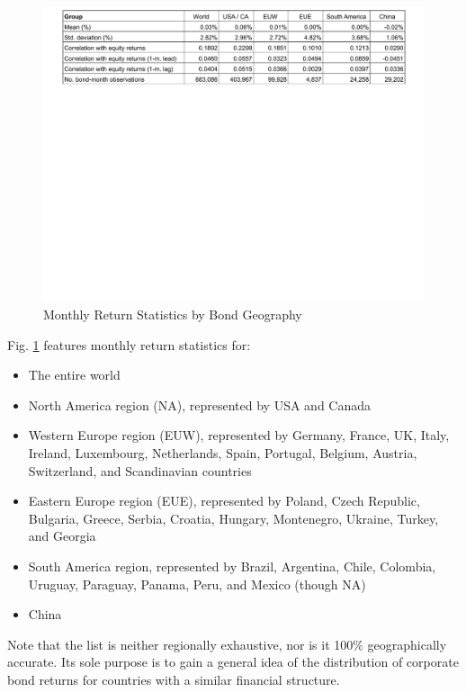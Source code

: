\begin{figure}[h]
	\centering
	\includegraphics[trim={0 15.5cm 0 0},clip,width=1.0\linewidth]{figures/summary-stats-by-geo.pdf}
	\caption{Monthly Return Statistics by Bond Geography}
	\label{fig:summary-stats-by-geo}
\end{figure}

Fig. \ref{fig:summary-stats-by-geo} features monthly return statistics for:
\begin{itemize}
	\item The entire world
	\item North America region (NA), represented by USA and Canada
	\item Western Europe region (EUW), represented by Germany, France, UK, Italy, Ireland, Luxembourg, Netherlands, Spain, Portugal, Belgium, Austria, Switzerland, and Scandinavian countries
	\item Eastern Europe region (EUE), represented by Poland, Czech Republic, Bulgaria, Greece, Serbia, Croatia, Hungary, Montenegro, Ukraine, Turkey, and Georgia
	\item South America region, represented by Brazil, Argentina, Chile, Colombia, Uruguay, Paraguay, Panama, Peru, and Mexico (though NA)
	\item China 
\end{itemize}
Note that the list is neither regionally exhaustive, nor is it 100\% geographically accurate. Its sole purpose is to gain a general idea of the distribution of corporate bond returns for countries with a similar financial structure. 

